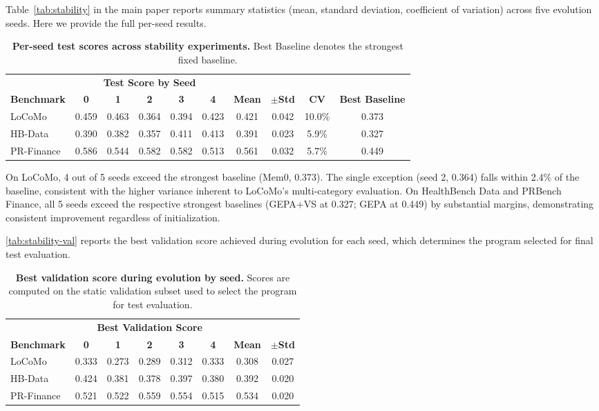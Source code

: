 Table~\ref{tab:stability} in the main paper reports summary statistics (mean, standard deviation, coefficient of variation) across five evolution seeds.
Here we provide the full per-seed results.

\begin{table}[!htbp]
\centering
\caption{\textbf{Per-seed test scores across stability experiments.}
Best Baseline denotes the strongest fixed baseline.}
\label{tab:stability-full}
\small
\setlength{\tabcolsep}{4pt}
\begin{tabular}{@{}l ccccc ccc c@{}}
\toprule
& \multicolumn{5}{c}{\textbf{Test Score by Seed}} & & & & \\
\cmidrule(r){2-6}
\textbf{Benchmark} & \textbf{0} & \textbf{1} & \textbf{2} & \textbf{3} & \textbf{4} & \textbf{Mean} & \textbf{$\pm$Std} & \textbf{CV} & \textbf{Best Baseline} \\
\midrule
LoCoMo     & 0.459 & 0.463 & 0.364 & 0.394 & 0.423 & 0.421 & 0.042 & 10.0\% & 0.373 \\
HB-Data    & 0.390 & 0.382 & 0.357 & 0.411 & 0.413 & 0.391 & 0.023 & 5.9\% & 0.327 \\
PR-Finance & 0.586 & 0.544 & 0.582 & 0.582 & 0.513 & 0.561 & 0.032 & 5.7\% & 0.449 \\
\bottomrule
\end{tabular}
\end{table}

On LoCoMo, 4 out of 5 seeds exceed the strongest baseline (Mem0, 0.373).
The single exception (seed 2, 0.364) falls within 2.4\% of the baseline, consistent with the higher variance inherent to LoCoMo's multi-category evaluation.
On HealthBench Data and PRBench Finance, all 5 seeds exceed the respective strongest baselines (GEPA+VS at 0.327; GEPA at 0.449) by substantial margins, demonstrating consistent improvement regardless of initialization.

\autoref{tab:stability-val} reports the best validation score achieved during evolution for each seed, which determines the program selected for final test evaluation.

\begin{table}[!htbp]
\centering
\caption{\textbf{Best validation score during evolution by seed.}
Scores are computed on the static validation subset used to select the program for test evaluation.}
\label{tab:stability-val}
\small
\setlength{\tabcolsep}{4pt}
\begin{tabular}{@{}l ccccc cc@{}}
\toprule
& \multicolumn{5}{c}{\textbf{Best Validation Score}} & & \\
\cmidrule(r){2-6}
\textbf{Benchmark} & \textbf{0} & \textbf{1} & \textbf{2} & \textbf{3} & \textbf{4} & \textbf{Mean} & \textbf{$\pm$Std} \\
\midrule
LoCoMo     & 0.333 & 0.273 & 0.289 & 0.312 & 0.333 & 0.308 & 0.027 \\
HB-Data    & 0.424 & 0.381 & 0.378 & 0.397 & 0.380 & 0.392 & 0.020 \\
PR-Finance & 0.521 & 0.522 & 0.559 & 0.554 & 0.515 & 0.534 & 0.020 \\
\bottomrule
\end{tabular}
\end{table}


